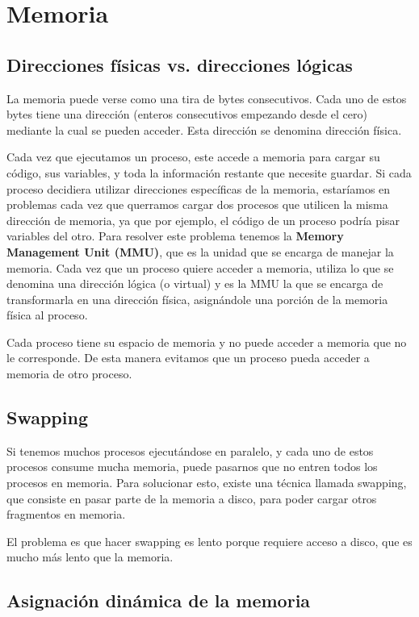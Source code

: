 \documentclass{article}
\begin{document}
\section{Memoria}

\subsection{Direcciones f\'isicas vs. direcciones l\'ogicas}

La memoria puede verse como una tira de bytes consecutivos. Cada uno de estos bytes tiene una direcci\'on (enteros consecutivos empezando desde el cero) mediante la cual se pueden acceder. Esta direcci\'on se denomina direcci\'on f\'isica.

Cada vez que ejecutamos un proceso, este accede a memoria para cargar su c\'odigo, sus variables, y toda la informaci\'on restante que necesite guardar. Si cada proceso decidiera utilizar direcciones espec\'ificas de la memoria, estar\'iamos en problemas cada vez que querramos cargar dos procesos que utilicen la misma direcci\'on de memoria, ya que por ejemplo, el c\'odigo de un proceso podr\'ia pisar variables del otro. Para resolver este problema tenemos la \textbf{Memory Management Unit (MMU)}, que es la unidad que se encarga de manejar la memoria. Cada vez que un proceso quiere acceder a memoria, utiliza lo que se denomina una direcci\'on l\'ogica (o virtual) y es la MMU la que se encarga de transformarla en una direcci\'on f\'isica, asign\'andole una porci\'on de la memoria f\'isica al proceso.

Cada proceso tiene su espacio de memoria y no puede acceder a memoria que no le corresponde. De esta manera evitamos que un proceso pueda acceder a memoria de otro proceso.

\subsection{Swapping}

Si tenemos muchos procesos ejecut\'andose en paralelo, y cada uno de estos procesos consume mucha memoria, puede pasarnos que no entren todos los procesos en memoria. Para solucionar esto, existe una t\'ecnica llamada swapping, que consiste en pasar parte de la memoria a disco, para poder cargar otros fragmentos en memoria.

El problema es que hacer swapping es lento porque requiere acceso a disco, que es mucho m\'as lento que la memoria.

\subsection{Asignaci\'on din\'amica de la memoria}
\end{document}
